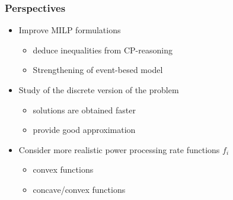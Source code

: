 \documentclass{beamer}
\begin{document}
  \begin{frame}
    \frametitle{Perspectives}
    \vfill
    \begin{itemize}
    \item Improve MILP formulations
      \pause
      \begin{itemize}
      \item deduce inequalities from CP-reasoning
      \item Strengthening of event-besed model
      \end{itemize}
      \vfill
      \pause
    \item Study of the discrete version of the problem
      \begin{itemize}
        \pause
      \item solutions are obtained faster  
      \item provide good approximation
      \end{itemize}
      \vfill
      \pause
    \item Consider more realistic power processing rate functions
      $f_i$
      \begin{itemize}
        \pause
      \item convex functions
      \item concave/convex functions
      \end{itemize}
    \end{itemize}
    \vfill
  \end{frame}
\end{document}
